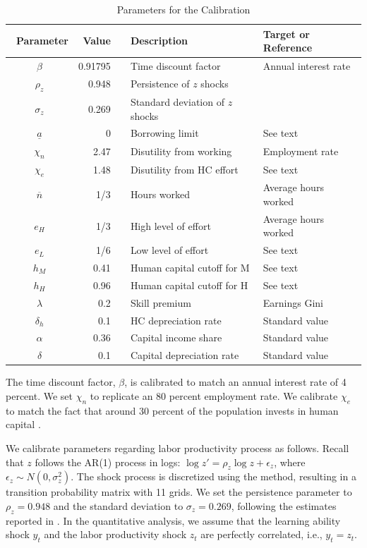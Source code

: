 \documentclass[12pt]{article}
\begin{document}
\begin{table}
\noindent{}%
\noindent\begin{minipage}[t]{1\columnwidth}%
\begin{center}
\caption{\protect\label{tbl:para}Parameters for the Calibration}

\begin{tabular}{crrll}
\toprule 
~Parameter  & Value  &  & Description  & Target or Reference\tabularnewline
\midrule 
$\beta$  & 0.91795 &  & Time discount factor  & Annual interest rate\tabularnewline
$\rho_{z}$  & 0.948  &  & Persistence of $z$ shocks  & \citet{Chang2006}\tabularnewline
$\sigma_{z}$  & 0.269  &  & Standard deviation of $z$ shocks  & \citet{Chang2006}\tabularnewline
$\underline{a}$  & 0  &  & Borrowing limit  & See text\tabularnewline
$\chi_{n}$  & 2.47  &  & Disutility from working  & Employment rate\tabularnewline
$\chi_{e}$  & 1.48  &  & Disutility from HC effort  & See text\tabularnewline
$\overline{n}$  & 1/3  &  & Hours worked  & Average hours worked\tabularnewline
$e_{H}$  & 1/3  &  & High level of effort  & Average hours worked\tabularnewline
$e_{L}$  & 1/6  &  & Low level of effort  & See text\tabularnewline
$h_{M}$  & 0.41  &  & Human capital cutoff for M  & See text\tabularnewline
$h_{H}$  & 0.96  &  & Human capital cutoff for H  & See text\tabularnewline
$\lambda$  & 0.2  &  & Skill premium  & Earnings Gini\tabularnewline
$\delta_h$  & 0.1  &  & HC depreciation rate & Standard value\tabularnewline
$\alpha$  & 0.36  &  & Capital income share  & Standard value\tabularnewline
$\delta$  & 0.1  &  & Capital depreciation rate  & Standard value\tabularnewline
\bottomrule
\end{tabular}
\par\end{center}%
\end{minipage}
\end{table}

The time discount factor, $\beta$, is calibrated to match an annual
interest rate of 4 percent. We set $\chi_{n}$ to replicate an 80
percent employment rate. We calibrate $\chi_{e}$ to match the fact
that around 30 percent of the population invests in human capital \citep{oecd2025adultlearning}.

We calibrate parameters regarding labor productivity process as follows.
Recall that $z$ follows the AR(1) process in logs: $\log z'=\rho_{z}\log z+\epsilon_{z}$,
where $\epsilon_{z}\sim N(0,\sigma_{z}^{2})$. The shock process is
discretized using the \citet{tauchen1986finite} method, resulting in a transition
probability matrix with 11 grids. We set the persistence parameter to $\rho_{z} = 0.948$ and the standard deviation to $\sigma_{z} = 0.269$, following the estimates reported in \citet{Chang2006}. In the quantitative analysis, we assume that the learning ability shock $y_t$ and the labor productivity shock $z_t$ are perfectly correlated, i.e., $y_t=z_t$.
\end{document}
